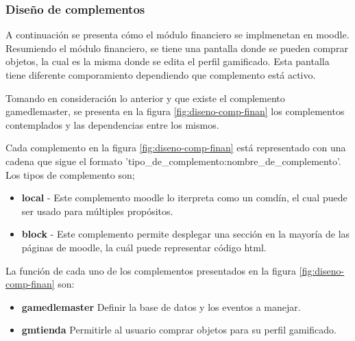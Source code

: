 

\subsubsection{Diseño de complementos}



A continuación se presenta cómo el módulo financiero
se implmenetan en moodle.\\


\noindent Resumiendo el módulo financiero, se  tiene una pantalla donde se pueden comprar
objetos, la cual es la misma donde se edita el perfil gamificado.
Esta pantalla tiene diferente comporamiento dependiendo que complemento está activo.


\noindent Tomando en consideración lo anterior y que existe el complemento gamedlemaster, se presenta en la figura \ref{fig:diseno-comp-finan}
los complementos contemplados y las dependencias entre los mismos.




Cada complemento en la figura \ref{fig:diseno-comp-finan} está representado con una cadena que sigue el formato 'tipo\_de\_complemento:nombre\_de\_complemento'.
Los tipos de complemento son;
\begin{itemize}
    \item \textbf{local} -  Este complemento moodle lo iterpreta como un comdín, el cual puede ser usado para múltiples propósitos.
    \item \textbf{block} - Este complemento permite desplegar una sección en la mayoría de las páginas de moodle, la cuál puede representar código html.
\end{itemize}

La función de cada uno de los complementos presentados en la figura \ref{fig:diseno-comp-finan} son:


\begin{itemize}
    \item \textbf{gamedlemaster} Definir la base de datos y los eventos a manejar.
    \item \textbf{gmtienda} Permitirle al usuario comprar objetos para su perfil gamificado.
\end{itemize} 

